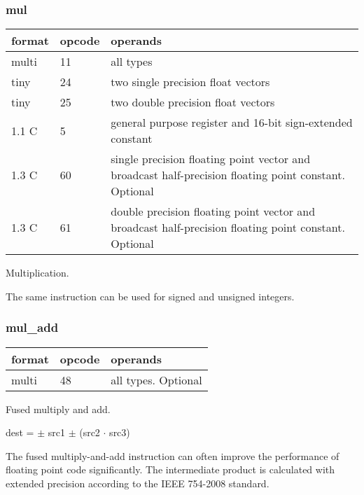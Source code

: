 \documentclass[forwardcom.tex]{subfiles}
\begin{document}
\subsubsection{mul}
\label{table:mulInstruction}
\begin{tabular}{|p{12mm}|p{12mm}|p{110mm}|}
\hline
\bfseries format & \bfseries opcode & \bfseries operands \\ \hline
multi & 11 & all types \\ \hline
tiny  & 24 & two single precision float vectors \\ \hline
tiny  & 25 & two double precision float vectors \\ \hline
1.1 C &  5 & general purpose register and 16-bit sign-extended constant \\ \hline
1.3 C & 60 & single precision floating point vector and broadcast half-precision floating point constant. Optional \\ \hline
1.3 C & 61 & double precision floating point vector and broadcast half-precision floating point constant. Optional \\ \hline
\end{tabular}
\vspace{2mm}

Multiplication.
\vspace{2mm}

The same instruction can be used for signed and unsigned integers.

\subsubsection{mul\_add}
\label{table:mulAddInstruction}
\begin{tabular}{|p{12mm}|p{12mm}|p{110mm}|}
\hline
\bfseries format & \bfseries opcode & \bfseries operands \\ \hline
multi & 48 & all types. Optional \\ \hline
\end{tabular}
\vspace{2mm}

Fused multiply and add.
\vspace{2mm}

dest = $\pm$ src1 $\pm$ (src2 $\cdot$ src3)
\vspace{2mm}

The fused multiply-and-add instruction can often improve the performance of floating point code significantly. The intermediate product is calculated with extended precision according to the IEEE 754-2008 standard.
\vspace{2mm}
\end{document}
